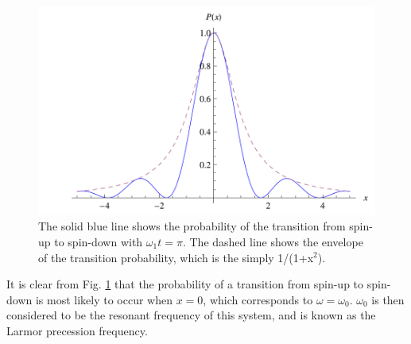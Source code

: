 \begin{figure}[h!]
  \centering \includegraphics[width=1\textwidth]{NMR_Lineshape.png}
  \caption{The solid blue line shows the probability of the transition
    from spin-up to spin-down with $\omega_1 t = \pi$.  The dashed
    line shows the envelope of the transition probability, which is
    the simply 1/(1+x$^2$).}
    \label{fig:trans}
\end{figure} 
%
It is clear from Fig. \ref{fig:trans} that the probability of a
transition from spin-up to spin-down is most likely to occur when
$x=0$, which corresponds to $\omega = \omega_0$.  $\omega_0$ is then
considered to be the resonant frequency of this system, and is known
as the Larmor precession frequency.
